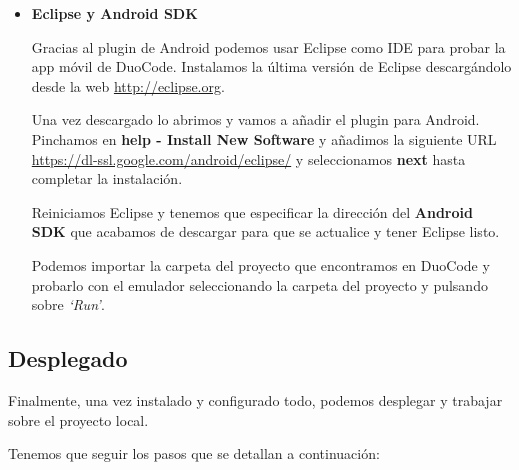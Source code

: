\begin{itemize}
\item \textbf{Eclipse y Android SDK}

Gracias al plugin de Android podemos usar Eclipse como IDE para probar la app móvil de DuoCode. Instalamos la última versión de Eclipse descargándolo desde la web \url{http://eclipse.org}.

Una vez descargado lo abrimos y vamos a añadir el plugin para Android.
Pinchamos en \textbf{help - Install New Software} y añadimos la siguiente URL \url{https://dl-ssl.google.com/android/eclipse/} y seleccionamos \textbf{next} hasta completar la instalación.

Reiniciamos Eclipse y tenemos que especificar la dirección del \textbf{Android SDK} que acabamos de descargar para que se actualice y tener Eclipse listo.

Podemos importar la carpeta del proyecto que encontramos en DuoCode y probarlo con el emulador seleccionando la carpeta del proyecto y pulsando sobre \textit{`Run'}.

\end{itemize}

\subsection{Desplegado}

Finalmente, una vez instalado y configurado todo, podemos desplegar y trabajar sobre el proyecto local.

Tenemos que seguir los pasos que se detallan a continuación:

